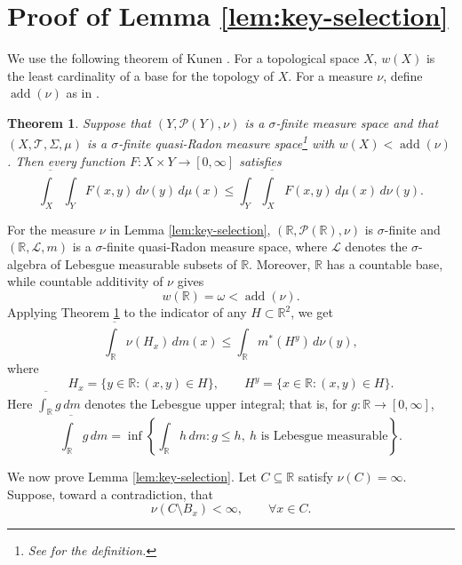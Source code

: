 \documentclass{amsart}
\theoremstyle{plain}
\newtheorem{theorem}{Theorem}[section]
\theoremstyle{definition}
\newcommand{\R}{\mathbb{R}}
\newcommand{\Pc}{\mathcal{P}}
\newcommand{\Lc}{\mathcal{L}}
\newcommand{\add}{\operatorname{add}}
\begin{document}
\section{Proof of Lemma \ref{lem:key-selection}}\label{sec:key-selection}

We use the following theorem of Kunen \cite[543C]{FremlinVol5Ch54}.
For a topological space $X$, $w(X)$ is the least cardinality of a base for the topology of $X$.
For a measure $\nu$, define $\add(\nu)$ as in \cite[511G(a)]{FremlinVol5Ch51}.
\begin{theorem}\label{thm:kunen}
Suppose that $(Y,\Pc(Y),\nu)$ is a $\sigma$-finite measure space and that $(X,\mathcal T,\Sigma,\mu)$ is a $\sigma$-finite quasi-Radon measure space\footnote{See \cite[411H(a)]{FremlinVol4Ch41} for the definition.} with $w(X)<\add(\nu)$.
Then every function $F:X\times Y\to[0,\infty]$ satisfies
\begin{equation}\label{eq:fremlin-kunen}
\overline{\int_X}\int_Y F(x,y)\,d\nu(y)\,d\mu(x)
\le
\int_Y \overline{\int_X} F(x,y)\,d\mu(x)\,d\nu(y).
\end{equation}
\end{theorem}

For the measure $\nu$ in Lemma \ref{lem:key-selection}, $(\R,\Pc(\R),\nu)$ is $\sigma$-finite and $(\R,\Lc,m)$ is a $\sigma$-finite quasi-Radon measure space, where $\Lc$ denotes the $\sigma$-algebra of Lebesgue measurable subsets of $\R$.
Moreover, $\R$ has a countable base, while countable additivity of $\nu$ gives
\[
w(\R)=\omega<\add(\nu).
\]
Applying Theorem \ref{thm:kunen} to the indicator of any $H\subset\R^2$, we get
\begin{equation}\label{eq:section-inequality}
\overline{\int_\R}\nu(H_x)\,dm(x)
\le
\int_\R m^*(H^y)\,d\nu(y),
\end{equation}
where
\[
H_x=\{y\in\R:(x,y)\in H\},
\qquad
H^y=\{x\in\R:(x,y)\in H\}.
\]
Here $\overline{\int_\R} g\,dm$ denotes the Lebesgue upper integral; that is, for $g:\R\to[0,\infty]$,
\[
\overline{\int_\R} g\,dm
=
\inf\left\{\int_\R h\,dm:g\le h,\ h\text{ is Lebesgue measurable}\right\}.
\]

We now prove Lemma \ref{lem:key-selection}.
Let $C\subseteq\R$ satisfy $\nu(C)=\infty$.
Suppose, toward a contradiction, that
\begin{equation}\label{eq:contrary}
\nu(C\setminus B_x)<\infty,
\qquad
\forall x\in C.
\end{equation}
\end{document}

